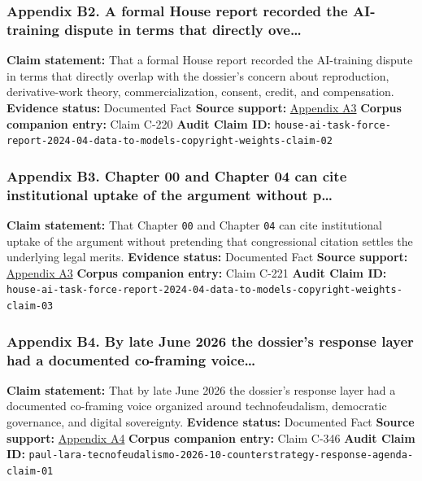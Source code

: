 \documentclass[
  american,
  11pt,
  letterpaper,
]{article}
\begin{document}
\subsubsection{Appendix B2. A formal House report recorded the
AI-training dispute in terms that directly
ove\ldots{}}\label{appendix-b2-a-formal-house-report-recorded-the-ai-training-dispute-in-terms-that-directly-ove}

\textbf{Claim statement:} That a formal House report recorded the
AI-training dispute in terms that directly overlap with the dossier's
concern about reproduction, derivative-work theory, commercialization,
consent, credit, and compensation. \textbf{Evidence status:} Documented
Fact \textbf{Source support:}
\hyperref[appendix-a3-bipartisan-house-task-force-report-on-artificial-intelligence]{Appendix
A3} \textbf{Corpus companion entry:} Claim C-220 \textbf{Audit Claim
ID:}
\texttt{house-ai-task-force-report-2024-04-data-to-models-copyright-weights-claim-02}

\subsubsection{Appendix B3. Chapter 00 and Chapter 04 can cite
institutional uptake of the argument without
p\ldots{}}\label{appendix-b3-chapter-00-and-chapter-04-can-cite-institutional-uptake-of-the-argument-without-p}

\textbf{Claim statement:} That Chapter \texttt{00} and Chapter
\texttt{04} can cite institutional uptake of the argument without
pretending that congressional citation settles the underlying legal
merits. \textbf{Evidence status:} Documented Fact \textbf{Source
support:}
\hyperref[appendix-a3-bipartisan-house-task-force-report-on-artificial-intelligence]{Appendix
A3} \textbf{Corpus companion entry:} Claim C-221 \textbf{Audit Claim
ID:}
\texttt{house-ai-task-force-report-2024-04-data-to-models-copyright-weights-claim-03}

\subsubsection{Appendix B4. By late June 2026 the dossier's response
layer had a documented co-framing
voice\ldots{}}\label{appendix-b4-by-late-june-2026-the-dossier-s-response-layer-had-a-documented-co-framing-voice}

\textbf{Claim statement:} That by late June 2026 the dossier's response
layer had a documented co-framing voice organized around
technofeudalism, democratic governance, and digital sovereignty.
\textbf{Evidence status:} Documented Fact \textbf{Source support:}
\hyperref[appendix-a4-c-mo-hackear-al-tecnofeudalismo]{Appendix A4}
\textbf{Corpus companion entry:} Claim C-346 \textbf{Audit Claim ID:}
\texttt{paul-lara-tecnofeudalismo-2026-10-counterstrategy-response-agenda-claim-01}
\end{document}
